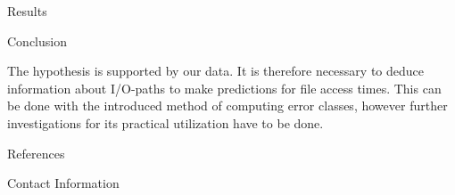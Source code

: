 \documentclass[final]{beamer}
\newlength{\onecolwid}
\begin{document}
\begin{frame}[t]
\begin{columns}[t]
\begin{column}{\onecolwid}
\begin{block}{Results}
\end{block}


\vspace*{-2cm}
\begin{block}{Conclusion}

	The hypothesis is supported by our data.
	It is therefore necessary to deduce information about I/O-paths to make predictions for file access times.
	This can be done with the introduced method of computing error classes, however further investigations for its practical utilization have to be done. 

\end{block}



\begin{block}{References}

\nocite{*} %
\footnotesize{
\vspace{0.75in}}

\end{block}


%
%
%


\vspace*{-1.5cm}
\begin{alertblock}{Contact Information}


\end{alertblock}
\end{column}
\end{columns}
\end{frame}
\end{document}
